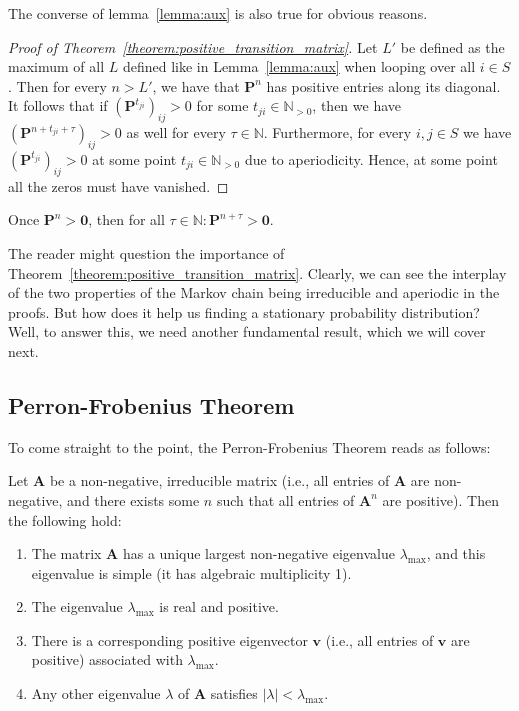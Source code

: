 \documentclass[../../main.tex]{subfiles}
\begin{document}
\begin{remark}
    The converse of lemma~\ref{lemma:aux} is also true for obvious reasons.
\end{remark}

\begin{proof}[Proof of Theorem~\ref{theorem:positive_transition_matrix}]
    Let $L'$ be defined as the maximum of all $L$ defined like in Lemma~\ref{lemma:aux} when looping over all $i \in S$. Then for every $n > L'$, we have that $\bm{P}^n$ has positive entries along its diagonal. It follows that if $(\bm{P}^{t_{ji}})_{ij} > 0$ for some $t_{ji} \in \mathbb{N}_{>0}$, then we have $(\bm{P}^{n + t_{ji} + \tau})_{ij} > 0$ as well for every $\tau \in \mathbb{N}$. Furthermore, for every $i,j \in S$ we have $(\bm{P}^{t_{ji}})_{ij} > 0$ at some point $t_{ji} \in \mathbb{N}_{>0}$ due to aperiodicity. Hence, at some point all the zeros must have vanished.
\end{proof}

\begin{corollary}
    Once $\bm{P}^n > \bm{0}$, then for all $\tau \in \mathbb{N}: \bm{P}^{n + \tau} > \bm{0}$. 
\end{corollary}

The reader might question the importance of Theorem~\ref{theorem:positive_transition_matrix}. Clearly, we can see the interplay of the two properties of the Markov chain being irreducible and aperiodic in the proofs. But how does it help us finding a stationary probability distribution? Well, to answer this, we need another fundamental result, which we will cover next.


\subsection{Perron-Frobenius Theorem}
To come straight to the point, the Perron-Frobenius Theorem reads as follows:

\begin{theorem}
    Let \( \bm{A} \) be a non-negative, irreducible matrix (i.e., all entries of \( \bm{A} \) are non-negative, and there exists some \( n \) such that all entries of \( \bm{A}^n \) are positive). Then the following hold:

    \begin{enumerate}
        \item The matrix \( \bm{A} \) has a unique largest non-negative eigenvalue \( \lambda_{\max} \), and this eigenvalue is simple (it has algebraic multiplicity 1).
        \item The eigenvalue \( \lambda_{\max} \) is real and positive.
        \item There is a corresponding positive eigenvector \( \bm{v} \) (i.e., all entries of \( \bm{v} \) are positive) associated with \( \lambda_{\max} \).
        \item Any other eigenvalue \( \lambda \) of \( \bm{A} \) satisfies \( |\lambda| < \lambda_{\max} \).
    \end{enumerate}
\end{theorem}
\end{document}
